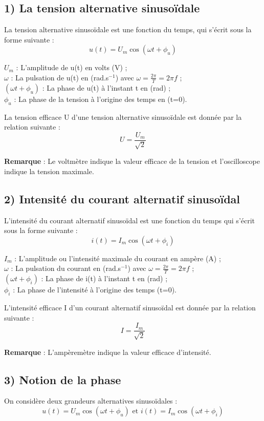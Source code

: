 \documentclass[12pt]{article}
\begin{document}
\subsection*{1) La tension alternative sinusoïdale}
La tension alternative sinusoïdale est une fonction du temps, qui s'écrit sous la forme suivante :
\[ u(t) = U_m\cos(\omega t + \phi_u) \]

$U_m$ : L'amplitude de u(t) en volts (V) ;\\
$\omega$ : La pulsation de u(t) en (rad.s$^{-1}$) avec $\omega = \frac{2\pi}{T} = 2\pi f$ ;\\
$(\omega t + \phi_u)$ : La phase de u(t) à l'instant t en (rad) ;\\
$\phi_u$ : La phase de la tension à l'origine des temps en (t=0).

La tension efficace U d'une tension alternative sinusoïdale est donnée par la relation suivante : 
\[ U = \frac{U_m}{\sqrt{2}} \]

\textbf{Remarque} : Le voltmètre indique la valeur efficace de la tension et l'oscilloscope indique la tension maximale.

\subsection*{2) Intensité du courant alternatif sinusoïdal}
L'intensité du courant alternatif sinusoïdal est une fonction du temps qui s'écrit sous la forme suivante :
\[ i(t) = I_m\cos(\omega t + \phi_i) \]

$I_m$ : L'amplitude ou l'intensité maximale du courant en ampère (A) ;\\
$\omega$ : La pulsation du courant en (rad.s$^{-1}$) avec $\omega = \frac{2\pi}{T} = 2\pi f$ ;\\
$(\omega t + \phi_i)$ : La phase de i(t) à l'instant t en (rad) ;\\
$\phi_i$ : La phase de l'intensité à l'origine des temps (t=0).

L'intensité efficace I d'un courant alternatif sinusoïdal est donnée par la relation suivante : 
\[ I = \frac{I_m}{\sqrt{2}} \]

\textbf{Remarque} : L'ampèremètre indique la valeur efficace d'intensité.

\subsection*{3) Notion de la phase}
On considère deux grandeurs alternatives sinusoïdales :
\[ u(t) = U_m\cos(\omega t + \phi_u) \text{ et } i(t) = I_m\cos(\omega t + \phi_i) \]
\end{document}
